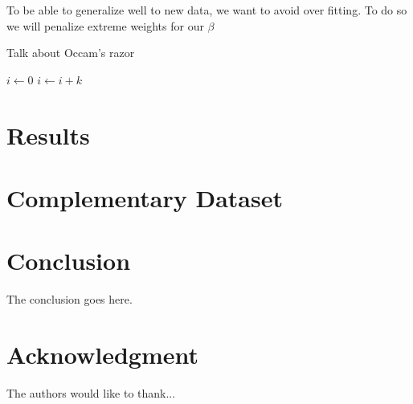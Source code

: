 \documentclass[conference]{IEEEtran}
\begin{document}
To be able to generalize well to new data, we want to avoid over fitting. To do
so we will penalize extreme weights for our $\beta$

Talk about Occam's razor


\begin{algorithmic}
    \State $i\gets 0$
\Else
        \State $i\gets i+k$
    \EndIf
\EndIf
\end{algorithmic}

\section{Results}

\section{Complementary Dataset}


\section{Conclusion}
The conclusion goes here.






\section*{Acknowledgment}


The authors would like to thank...







%
%
\end{document}
